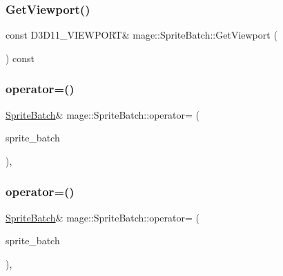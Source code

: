 \subsubsection{\texorpdfstring{Get\+Viewport()}{GetViewport()}}
{\footnotesize\ttfamily const D3\+D11\+\_\+\+V\+I\+E\+W\+P\+O\+RT\& mage\+::\+Sprite\+Batch\+::\+Get\+Viewport (\begin{DoxyParamCaption}{ }\end{DoxyParamCaption}) const}

\hypertarget{classmage_1_1_sprite_batch_aa2a5df588d7589a36b38b35dc8a08a48}{}\label{classmage_1_1_sprite_batch_aa2a5df588d7589a36b38b35dc8a08a48} 
\subsubsection{\texorpdfstring{operator=()}{operator=()}\hspace{0.1cm}{\footnotesize\ttfamily [1/2]}}
{\footnotesize\ttfamily \hyperlink{classmage_1_1_sprite_batch}{Sprite\+Batch}\& mage\+::\+Sprite\+Batch\+::operator= (\begin{DoxyParamCaption}\item[{const \hyperlink{classmage_1_1_sprite_batch}{Sprite\+Batch} \&}]{sprite\+\_\+batch }\end{DoxyParamCaption})\hspace{0.3cm}{\ttfamily [private]}, {\ttfamily [delete]}}

\hypertarget{classmage_1_1_sprite_batch_ad46c172200bf47c10fa13fb3a70a4104}{}\label{classmage_1_1_sprite_batch_ad46c172200bf47c10fa13fb3a70a4104} 
\subsubsection{\texorpdfstring{operator=()}{operator=()}\hspace{0.1cm}{\footnotesize\ttfamily [2/2]}}
{\footnotesize\ttfamily \hyperlink{classmage_1_1_sprite_batch}{Sprite\+Batch}\& mage\+::\+Sprite\+Batch\+::operator= (\begin{DoxyParamCaption}\item[{\hyperlink{classmage_1_1_sprite_batch}{Sprite\+Batch} \&\&}]{sprite\+\_\+batch }\end{DoxyParamCaption})\hspace{0.3cm}{\ttfamily [private]}, {\ttfamily [delete]}}

